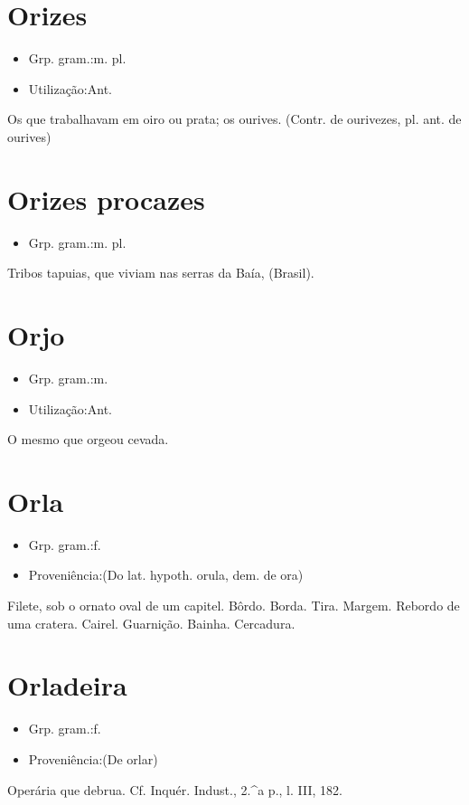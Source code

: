 \section{Orizes}
\begin{itemize}
\item {Grp. gram.:m. pl.}
\end{itemize}
\begin{itemize}
\item {Utilização:Ant.}
\end{itemize}
Os que trabalhavam em oiro ou prata; os ourives.
(Contr. de \textunderscore ourivezes\textunderscore , pl. ant. de \textunderscore ourives\textunderscore )
\section{Orizes procazes}
\begin{itemize}
\item {Grp. gram.:m. pl.}
\end{itemize}
Tribos tapuias, que viviam nas serras da Baía, (Brasil).
\section{Orjo}
\begin{itemize}
\item {Grp. gram.:m.}
\end{itemize}
\begin{itemize}
\item {Utilização:Ant.}
\end{itemize}
O mesmo que \textunderscore orge\textunderscore  ou \textunderscore cevada\textunderscore .
\section{Orla}
\begin{itemize}
\item {Grp. gram.:f.}
\end{itemize}
\begin{itemize}
\item {Proveniência:(Do lat. \textunderscore hypoth\textunderscore . \textunderscore orula\textunderscore , dem. de \textunderscore ora\textunderscore )}
\end{itemize}
Filete, sob o ornato oval de um capitel.
Bôrdo.
Borda.
Tira.
Margem.
Rebordo de uma cratera.
Cairel.
Guarnição.
Bainha.
Cercadura.
\section{Orladeira}
\begin{itemize}
\item {Grp. gram.:f.}
\end{itemize}
\begin{itemize}
\item {Proveniência:(De \textunderscore orlar\textunderscore )}
\end{itemize}
Operária que debrua. Cf. \textunderscore Inquér. Indust.\textunderscore , 2.^a p., l. III, 182.
